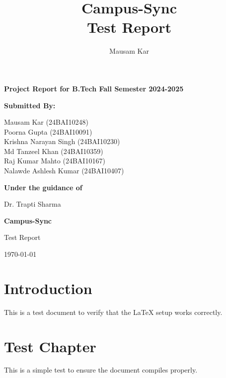 \documentclass[12pt,a4paper]{report}
\title{\Huge \textbf{Campus-Sync} \\ \Large Test Report}
\author{Mausam Kar}
\begin{document}
\begin{titlepage}
    \centering
    \vspace{2cm}
    
    {\LARGE \textbf{Project Report for B.Tech Fall Semester 2024-2025}}\\
    
    \vspace{3cm}
    
    {\Large \textbf{Submitted By:}}\\
    
    \vspace{0.5cm}
    
    {\large
    Mausam Kar (24BAI10248)\\
    Poorna Gupta (24BAI10091)\\
    Krishna Narayan Singh (24BAI10230)\\
    Md Tanzeel Khan (24BAI10359)\\
    Raj Kumar Mahto (24BAI10167)\\
    Nalawde Ashlesh Kumar (24BAI10407)\\
    }
    
    \vspace{2cm}
    
    {\Large \textbf{Under the guidance of}}\\
    
    \vspace{0.5cm}
    
    {\large
    Dr. Trapti Sharma\\
    }
    
    \vspace{3cm}
    
    {\LARGE \textbf{Campus-Sync}}\\
    
    \vspace{0.5cm}
    
    {\Large Test Report}\\
    
    \vspace{2cm}
    
    {\large \today}
    
\end{titlepage}

\thispagestyle{empty}

\tableofcontents

\chapter{Introduction}

This is a test document to verify that the LaTeX setup works correctly.

\chapter{Test Chapter}

This is a simple test to ensure the document compiles properly.
\end{document}
